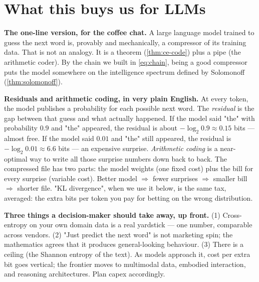 \documentclass[12pt,a4paper]{article}
\theoremstyle{plain}
\theoremstyle{definition}
\begin{document}


\section{What this buys us for LLMs}
\label{sec:llms}

\begin{intuition}
\textbf{The one-line version, for the coffee chat.}  A large language
model trained to guess the next word is, provably and mechanically,
a compressor of its training data.  That is not an analogy.  It is a
theorem (\cref{thm:ce-code}) plus a pipe (the arithmetic coder).
By the chain we built in \cref{eq:chain}, being a good compressor
puts the model somewhere on the intelligence spectrum defined by
Solomonoff (\cref{thm:solomonoff}).

\textbf{Residuals and arithmetic coding, in very plain English.}
At every token, the model publishes a probability for each possible
next word.  The \emph{residual} is the gap between that guess and
what actually happened.  If the model said "the" with probability
$0.9$ and "the" appeared, the residual is about $-\log_2 0.9 \approx
0.15$ bits --- almost free.  If the model said $0.01$ and "the" still
appeared, the residual is $-\log_2 0.01 \approx 6.6$ bits --- an
expensive surprise.  \emph{Arithmetic coding} is a near-optimal way
to write all those surprise numbers down back to back.  The
compressed file has two parts: the model weights (one fixed cost)
plus the bill for every surprise (variable cost).  Better model
$\Rightarrow$ fewer surprises $\Rightarrow$ smaller bill
$\Rightarrow$ shorter file.  "KL divergence", when we use it below,
is the same tax, averaged: the extra bits per token you pay for
betting on the wrong distribution.

\textbf{Three things a decision-maker should take away, up front.}
(1) Cross-entropy on your own domain data is a real yardstick ---
one number, comparable across vendors.  (2) "Just predict the next
word" is not marketing spin; the mathematics agrees that it produces
general-looking behaviour.  (3) There is a ceiling (the Shannon
entropy of the text).  As models approach it, cost per extra bit
goes vertical; the frontier moves to multimodal data, embodied
interaction, and reasoning architectures.  Plan capex accordingly.


\end{intuition}
\end{document}

